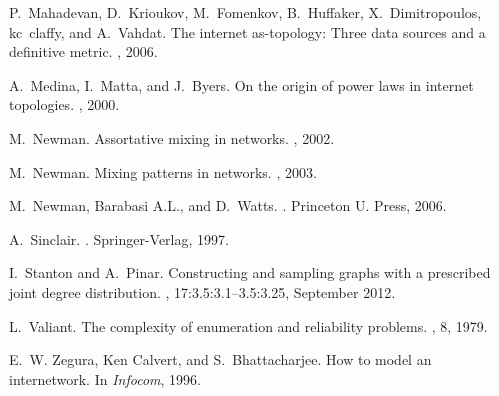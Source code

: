 \documentclass[12pt,a4paper]{article}
\theoremstyle{definition}
\theoremstyle{plain}
\begin{document}
\begin{thebibliography}{10}
P.~Mahadevan, D.~Krioukov, M.~Fomenkov, B.~Huffaker, X.~Dimitropoulos,
  kc~claffy, and A.~Vahdat.
\newblock The internet as-topology: Three data sources and a definitive metric.
, 2006.

A.~Medina, I.~Matta, and J.~Byers.
\newblock On the origin of power laws in internet topologies.
, 2000.

M.~Newman.
\newblock Assortative mixing in networks.
, 2002.

M.~Newman.
\newblock Mixing patterns in networks.
, 2003.

M.~Newman, Barabasi A.L., and D.~Watts.
.
\newblock Princeton U. Press, 2006.

A.~Sinclair.
.
\newblock Springer-Verlag, 1997.

I.~Stanton and A.~Pinar.
\newblock Constructing and sampling graphs with a prescribed joint degree
  distribution.
, 17:3.5:3.1--3.5:3.25, September 2012.

L.~Valiant.
\newblock The complexity of enumeration and reliability problems.
, 8, 1979.

E.~W. Zegura, Ken Calvert, and S.~Bhattacharjee.
\newblock How to model an internetwork.
\newblock In {\em Infocom}, 1996.


\end{thebibliography}
\end{document}
